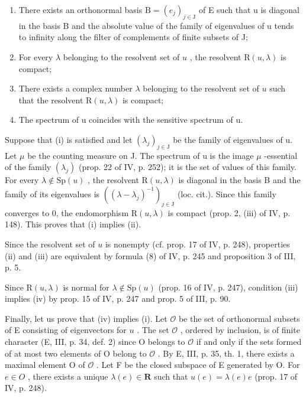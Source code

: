 \begin{enumerate}
\def\labelenumi{(\roman{enumi})}
\item
  There exists an orthonormal basis \(\mathrm{B} = (e_{j})_{j \in \mathrm{J}}\) of E such that u is diagonal in the basis B and the absolute value of the family of eigenvalues of u tends to infinity along the filter of complements of finite subsets of J;
\item
  For every \(\lambda\) belonging to the resolvent set of \(u\) , the resolvent \(\mathrm{R}(u,\lambda)\) is compact;
\item
  There exists a complex number \(\lambda\) belonging to the resolvent set of \(u\) such that the resolvent \(\mathrm{R}(u,\lambda)\) is compact;
\item
  The spectrum of u coincides with the sensitive spectrum of u.
\end{enumerate}

Suppose that (i) is satisfied and let \((\lambda_{j})_{j\in\mathrm{J}}\) be the family of eigenvalues of u. Let \(\mu\) be the counting measure on J. The spectrum of u is the image \(\mu\) -essential of the family \((\lambda_{j})\) (prop. 22 of IV, p. 252); it is the set of values of this family. For every \(\lambda\notin\mathrm{Sp}(u)\) , the resolvent \(\mathrm{R}(u,\lambda)\) is diagonal in the basis B and the family of its eigenvalues is \(((\lambda-\lambda_{j})^{-1})_{j\in\mathrm{J}}\) (loc. cit.). Since this family converges to 0, the endomorphism \(\mathrm{R}(u,\lambda)\) is compact (prop. 2, (iii) of IV, p. 148). This proves that (i) implies (ii).

Since the resolvent set of \(u\) is nonempty (cf. prop. 17 of IV, p. 248), properties (ii) and (iii) are equivalent by formula (8) of IV, p. 245 and proposition 3 of III, p. 5.

Since \(\mathrm{R}(u,\lambda)\) is normal for \(\lambda\notin\mathrm{Sp}(u)\) (prop. 16 of IV, p. 247), condition (iii) implies (iv) by prop. 15 of IV, p. 247 and prop. 5 of III, p. 90.

Finally, let us prove that (iv) implies (i). Let \(\mathcal{O}\) be the set of orthonormal subsets of E consisting of eigenvectors for \(u\) . The set \(\mathcal{O}\) , ordered by inclusion, is of finite character (E, III, p. 34, def. 2) since O belongs to \(\mathcal{O}\) if and only if the sets formed of at most two elements of O belong to \(\mathcal{O}\) . By E, III, p. 35, th. 1, there exists a maximal element O of \(\mathcal{O}\) . Let F be the closed subspace of E generated by O. For \(e \in O\) , there exists a unique \(\lambda(e) \in \mathbf{R}\) such that \(u(e) = \lambda(e)e\) (prop. 17 of IV, p. 248).

